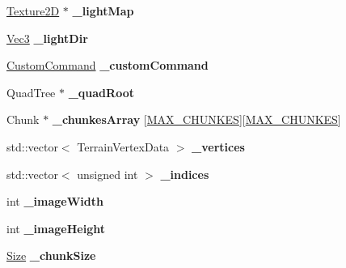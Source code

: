 \begin{DoxyCompactItemize}
\item 
\mbox{\label{classTerrain_a9663ece0089390ece205e7da2a14cc39}} 
\hyperlink{classTexture2D}{Texture2D} $\ast$ {\bfseries \+\_\+light\+Map}
\item 
\mbox{\label{classTerrain_a06d8e076d689580fbc9fc45c4d3d7ec2}} 
\hyperlink{classVec3}{Vec3} {\bfseries \+\_\+light\+Dir}
\item 
\mbox{\label{classTerrain_a13ba94ae28c413abeff7545c5601126a}} 
\hyperlink{classCustomCommand}{Custom\+Command} {\bfseries \+\_\+custom\+Command}
\item 
\mbox{\label{classTerrain_abc796e9f0fcab109f380b79fe04dcda2}} 
Quad\+Tree $\ast$ {\bfseries \+\_\+quad\+Root}
\item 
\mbox{\label{classTerrain_a188035680fe634f697c54d6d27f6da15}} 
Chunk $\ast$ {\bfseries \+\_\+chunkes\+Array} \mbox{[}\hyperlink{group____3d_gab12c6db0eef20a3be56a8bf8452ae432}{M\+A\+X\+\_\+\+C\+H\+U\+N\+K\+ES}\mbox{]}\mbox{[}\hyperlink{group____3d_gab12c6db0eef20a3be56a8bf8452ae432}{M\+A\+X\+\_\+\+C\+H\+U\+N\+K\+ES}\mbox{]}
\item 
\mbox{\label{classTerrain_a2f3e3bbc9b1e274c8b083427a171e650}} 
std\+::vector$<$ Terrain\+Vertex\+Data $>$ {\bfseries \+\_\+vertices}
\item 
\mbox{\label{classTerrain_a9f2105caefa905cb5bd2b7f4ee029021}} 
std\+::vector$<$ unsigned int $>$ {\bfseries \+\_\+indices}
\item 
\mbox{\label{classTerrain_afe2a4f034f926d90bd95b52be628a5bb}} 
int {\bfseries \+\_\+image\+Width}
\item 
\mbox{\label{classTerrain_a0c21e654fea59ade3456261eacb08d1f}} 
int {\bfseries \+\_\+image\+Height}
\item 
\mbox{\label{classTerrain_a106914f06b461e7b1cc4a482cfd3c55f}} 
\hyperlink{classSize}{Size} {\bfseries \+\_\+chunk\+Size}
\item 
\mbox{\label{classTerrain_a3225243da2886e6e700d09d696db5fa8}} 

\end{DoxyCompactItemize}
